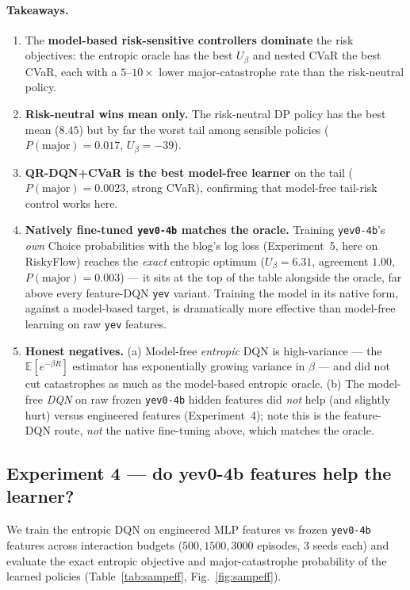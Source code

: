 \documentclass[11pt]{article}
\newcommand{\Ubeta}{U_{\beta}}
\newcommand{\E}{\mathbb{E}}
\begin{document}
\paragraph{Takeaways.}
\begin{enumerate}[nosep]
\item The \textbf{model-based risk-sensitive controllers dominate} the risk
  objectives: the entropic oracle has the best $\Ubeta$ and nested CVaR the best
  CVaR, each with a $5$--$10\times$ lower major-catastrophe rate than the
  risk-neutral policy.
\item \textbf{Risk-neutral wins mean only.} The risk-neutral DP policy has the best
  mean ($8.45$) but by far the worst tail among sensible policies
  ($P(\text{major}){=}0.017$, $\Ubeta{=}-39$).
\item \textbf{QR-DQN+CVaR is the best model-free learner} on the tail
  ($P(\text{major}){=}0.0023$, strong CVaR), confirming that model-free tail-risk
  control works here.
\item \textbf{Natively fine-tuned \texttt{yev0-4b} matches the oracle.} Training
  \texttt{yev0-4b}'s \emph{own} Choice probabilities with the blog's log loss
  (Experiment~5, here on RiskyFlow) reaches the \emph{exact} entropic optimum
  ($\Ubeta{=}6.31$, agreement $1.00$, $P(\text{major}){=}0.003$) --- it sits at the
  top of the table alongside the oracle, far above every feature-DQN \texttt{yev}
  variant. Training the model in its native form, against a model-based target, is
  dramatically more effective than model-free learning on raw \texttt{yev} features.
\item \textbf{Honest negatives.} (a) Model-free \emph{entropic} DQN is
  high-variance --- the $\E[e^{-\beta R}]$ estimator has exponentially growing
  variance in $\beta$ --- and did not cut catastrophes as much as the model-based
  entropic oracle. (b) The model-free \emph{DQN} on raw frozen \texttt{yev0-4b}
  hidden features did \emph{not} help (and slightly hurt) versus engineered
  features (Experiment~4); note this is the feature-DQN route, \emph{not} the
  native fine-tuning above, which matches the oracle.
\end{enumerate}

\subsection{Experiment 4 --- do yev0-4b features help the learner?}
\label{sec:sampeff}
We train the entropic DQN on engineered MLP features vs frozen \texttt{yev0-4b}
features across interaction budgets ($500,1500,3000$ episodes, $3$ seeds each) and
evaluate the exact entropic objective and major-catastrophe probability of the
learned policies (Table~\ref{tab:sampeff}, Fig.~\ref{fig:sampeff}).
\end{document}
